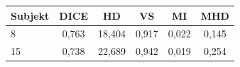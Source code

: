 \begin{tabular}{l c c c c c}
 \hline
Subjekt & DICE & HD & VS & MI & MHD \\ \hline
8 & 0,763 & 18,404 & 0,917 & 0,022 & 0,145 \\
15 & 0,738 & 22,689 & 0,942 & 0,019 & 0,254 \\
\hline 
 \end{tabular}
